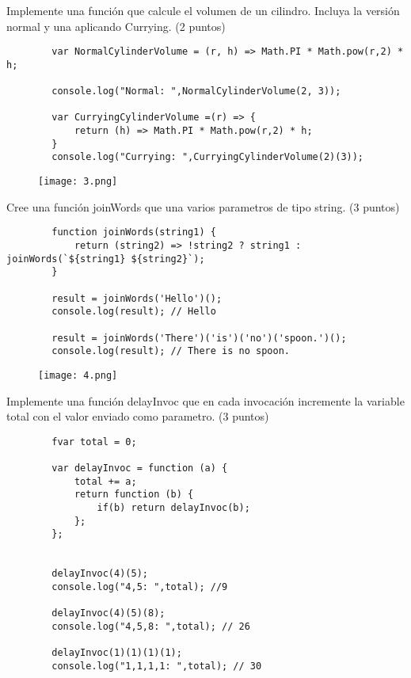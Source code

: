 \documentclass[12pt, a4paper]{exam}
\begin{document}
\begin{questions}
\pointsdroppedatright
	\question Implemente una función que calcule el volumen de un cilindro. Incluya la versión normal y una aplicando Currying. (2 puntos)
	\begin{verbatim}
		var NormalCylinderVolume = (r, h) => Math.PI * Math.pow(r,2) * h;

		console.log("Normal: ",NormalCylinderVolume(2, 3));

		var CurryingCylinderVolume =(r) => {
			return (h) => Math.PI * Math.pow(r,2) * h;
		}
		console.log("Currying: ",CurryingCylinderVolume(2)(3));
	\end{verbatim}

	\begin{figure}[h]
		\texttt{[image: 3.png]}
	\end{figure}
\vspace{0.2in}

\pointsdroppedatright
	\question Cree una función joinWords que una varios parametros de tipo string. (3 puntos)
	\begin{verbatim}
		function joinWords(string1) {
			return (string2) => !string2 ? string1 : joinWords(`${string1} ${string2}`);
		}

		result = joinWords('Hello')();
		console.log(result); // Hello

		result = joinWords('There')('is')('no')('spoon.')();
		console.log(result); // There is no spoon.
	\end{verbatim}

	\begin{figure}[h]
		\texttt{[image: 4.png]}
	\end{figure}
\vspace{0.2in}

\pointsdroppedatright
	\question Implemente una función delayInvoc que en cada invocación incremente la variable total con el valor enviado como parametro. (3 puntos)
	\begin{verbatim}
		fvar total = 0;

		var delayInvoc = function (a) {
			total += a;
			return function (b) {        
				if(b) return delayInvoc(b);
			};
		};
		
		
		delayInvoc(4)(5);
		console.log("4,5: ",total); //9
		
		delayInvoc(4)(5)(8);
		console.log("4,5,8: ",total); // 26
		
		delayInvoc(1)(1)(1)(1);
		console.log("1,1,1,1: ",total); // 30
	\end{verbatim}


\end{questions}
\end{document}
